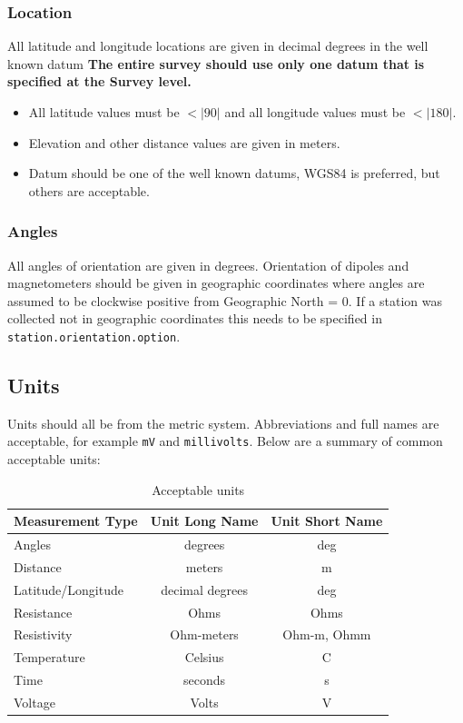 \documentclass{article}
\begin{document}
\subsubsection{Location}

All latitude and longitude locations are given in decimal degrees in the well known datum   \textbf{The entire survey should use only one datum that is specified at the Survey level.}

\begin{itemize}
	\setlength\itemsep{0em}
	\item All latitude values must be $<|90|$ and all longitude values must be $<|180|$.
	\item Elevation and other distance values are given in meters.
	\item Datum should be one of the well known datums, WGS84 is preferred, but others are acceptable.
\end{itemize} 

\subsubsection{Angles}

All angles of orientation are given in degrees.  Orientation of dipoles and magnetometers should be given in geographic coordinates where angles are assumed to be clockwise positive from Geographic North = 0.  If a station was collected not in geographic coordinates this needs to be specified in \verb|station.orientation.option|.   

\subsection{Units}
Units should all be from the metric system.  Abbreviations and full names are acceptable, for example \verb|mV| and \verb|millivolts|.  Below are a summary of common acceptable units:


\begin{table}[htb!]
	\centering
	\caption[Acceptable units]{Acceptable units}
	\begin{tabular}{|l|c|c|}
		\hline
		\textbf{Measurement Type} & \textbf{Unit Long Name}  & \textbf{Unit Short Name} \\ \hline
		Angles & degrees & deg \\ \hline
		
		Distance &  meters & m \\ \hline
		Latitude/Longitude & decimal degrees & deg \\ \hline
		Resistance & Ohms  &  Ohms \\ \hline
		Resistivity & Ohm-meters & Ohm-m, Ohmm \\ \hline
		Temperature & Celsius & C \\ \hline
		Time & seconds & s \\ \hline
		Voltage & Volts & V \\ \hline
		
		
	\end{tabular}
	\label{tab:units}
\end{table}
\end{document}

